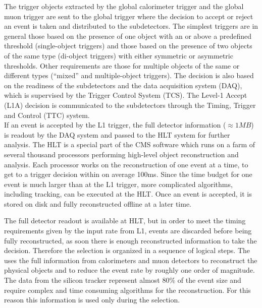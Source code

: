 The trigger objects extracted by the global calorimeter trigger and the global muon trigger are sent to the global trigger where the decision to accept or reject an event is taken and distributed to the subdetectors. 
The simplest triggers are in general those based on the presence of one object with an \ET or \PT above a predefined threshold (single-object triggers) and those based on the presence of two objects of the same type (di-object triggers) with either symmetric or asymmetric thresholds. Other requirements are those for multiple objects of the same or different types (``mixed'' and multiple-object triggers).
The decision is also based on the readiness of the subdetectors and the data acquisition system (DAQ), which is supervised by the Trigger Control System (TCS). The Level-1 Accept (L1A) decision is communicated to the subdetectors through the Timing, Trigger and Control (TTC) system.\\ 

If an event is accepted by the L1 trigger, the full detector information ($\approx1\unit{MB}$) is readout by the DAQ system and passed to the HLT system for further analysis. The HLT is a special part of the CMS software which runs on a farm of several thousand processors performing high-level object reconstruction and analysis.
Each processor works on the reconstruction of one event at a time, to get to a trigger decision within on average 100\unit{ms}. Since the time budget for one event is much larger than at the L1 trigger, more complicated algorithms, including tracking, can be executed at the HLT. Once an event is accepted, it is stored on disk and fully reconstructed offline at a later time. 

The full detector readout is available at HLT, but in order to meet the timing requirements given by the input rate from L1, events are discarded before being fully reconstructed, as soon there is enough reconstructed information to take the decision. Therefore the selection is organized in a sequence of logical steps. The \Ltwo uses the full information from calorimeters and muon detectors to reconstruct the physical objects and to reduce the event rate by roughly one order of magnitude. The data from the silicon tracker represent almost 80\% of the event size and require complex and time consuming algorithms for the reconstruction. For this reason this information is used only during the \Lthree selection.


